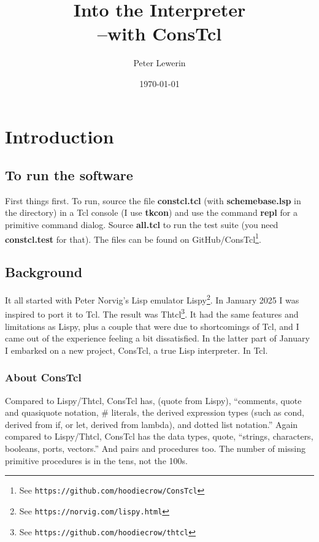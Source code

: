 \documentclass[twoside,9pt]{report}
\title{Into the Interpreter\\--with ConsTcl}
\author{Peter Lewerin}
\date{\today}
\begin{document}
\pagestyle{headings}
\maketitle
\tableofcontents

\chapter{Introduction}
\label{introduction}
\section{To run the software}
\label{to-run-the-software}


First things first. To run, source the file \textbf{constcl.tcl} (with
\textbf{schemebase.lsp} in the directory) in a Tcl console (I use
\textbf{tkcon}) and use the command \textbf{repl} for a primitive command
dialog. Source \textbf{all.tcl} to run the test suite (you need
\textbf{constcl.test} for that). The files can be found on GitHub/ConsTcl\footnote{See
\texttt{https://github.com/hoodiecrow/ConsTcl}}.

\section{Background}
\label{background}

It all started with Peter Norvig's Lisp emulator
Lispy\footnote{See \texttt{https://norvig.com/lispy.html}}. In January 2025 I
was inspired to port it to Tcl. The result was Thtcl\footnote{See
\texttt{https://github.com/hoodiecrow/thtcl}}. It had the same features and
limitations as Lispy, plus a couple that were due to shortcomings of Tcl, and I
came out of the experience feeling a bit dissatisfied. In the latter part of
January I embarked on a new project, ConsTcl, a true Lisp interpreter. In Tcl.

\subsection{About ConsTcl}
\label{about-constcl}

Compared to Lispy/Thtcl, ConsTcl has, (quote from Lispy), ``comments, quote and
quasiquote notation, \# literals, the derived expression types (such as cond,
derived from if, or let, derived from lambda), and dotted list notation.''
Again compared to Lispy/Thtcl, ConsTcl has the data types, quote, ``strings,
characters, booleans, ports, vectors.'' And pairs and procedures too. The
number of missing primitive procedures is in the tens, not the 100s. 
\end{document}
